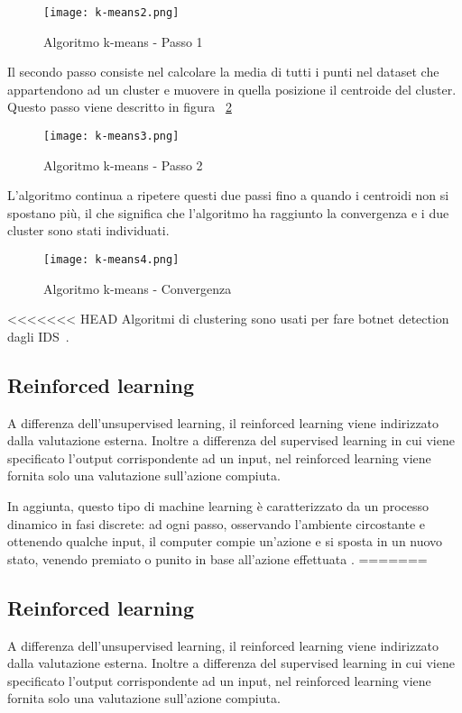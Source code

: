 \documentclass[../main.tex]{subfiles}
\begin{document}
\begin{figure}[H]
				\centering
				\texttt{[image: k-means2.png]}
				\caption{Algoritmo k-means - Passo 1}
				\label{fig:means2}
\end{figure}

Il secondo passo consiste nel calcolare la media di tutti i punti nel dataset che appartendono ad un cluster e muovere in quella posizione il centroide del cluster. Questo passo viene descritto in figura ~\ref{fig:means3}

\begin{figure}[H]
				\centering
				\texttt{[image: k-means3.png]}
				\caption{Algoritmo k-means - Passo 2}
				\label{fig:means3}
\end{figure}

L'algoritmo continua a ripetere questi due passi fino a quando i centroidi non si spostano più, il che significa che l'algoritmo ha raggiunto la convergenza e i due cluster sono stati individuati.

\begin{figure}[H]
				\centering
				\texttt{[image: k-means4.png]}
				\caption{Algoritmo k-means - Convergenza}
\end{figure}

<<<<<<< HEAD
Algoritmi di clustering sono usati per fare botnet detection dagli IDS~\cite{netflowbotnetdetection}.

\subsection{Reinforced learning}
A differenza dell'unsupervised learning, il reinforced learning viene indirizzato dalla valutazione esterna. Inoltre a differenza del supervised learning in cui viene specificato l'output corrispondente ad un input, nel reinforced learning viene fornita solo una valutazione sull'azione compiuta.

In aggiunta, questo tipo di machine learning è caratterizzato da un processo dinamico in fasi discrete: ad ogni passo, osservando l'ambiente circostante e ottenendo qualche input, il computer compie un'azione e si sposta in un nuovo stato, venendo premiato o punito in base all'azione effettuata \cite{compIntelligence}.
=======
\subsection{Reinforced learning}
A differenza dell'unsupervised learning, il reinforced learning viene indirizzato dalla valutazione esterna. Inoltre a differenza del supervised learning in cui viene specificato l'output corrispondente ad un input, nel reinforced learning viene fornita solo una valutazione sull'azione compiuta.
\end{document}
